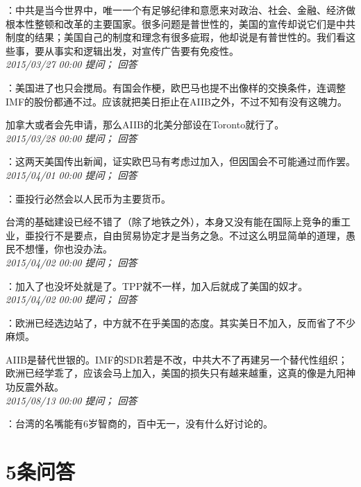 \documentclass[twocolumn]{ctexart}
\begin{document}
：中共是当今世界中，唯一一个有足够纪律和意愿来对政治、社会、金融、经济做根本性整顿和改革的主要国家。很多问题是普世性的，美国的宣传却说它们是中共制度的结果；美国自己的制度和理念有很多疵瑕，他却说是有普世性的。我们看这些事，要从事实和逻辑出发，对宣传广告要有免疫性。\\

\textit{\hfill\noindent\small 2015/03/27 00:00 提问； 回答}

：美国进了也只会搅局。有国会作梗，欧巴马也提不出像样的交换条件，连调整IMF的股份都通不过。应该就把美日拒止在AIIB之外，不过不知有没有这魄力。

加拿大或者会先申请，那么AIIB的北美分部设在Toronto就行了。\\

\textit{\hfill\noindent\small 2015/03/28 00:00 提问； 回答}

：这两天美国传出新闻，证实欧巴马有考虑过加入，但因国会不可能通过而作罢。\\

\textit{\hfill\noindent\small 2015/04/01 00:00 提问； 回答}

：亜投行必然会以人民币为主要货币。

台湾的基础建设已经不错了（除了地铁之外），本身又没有能在国际上竞争的重工业，亜投行不是要点，自由贸易协定才是当务之急。不过这么明显简单的道理，愚民不想懂，你也没办法。\\

\textit{\hfill\noindent\small 2015/04/02 00:00 提问； 回答}

：加入了也没坏处就是了。TPP就不一样，加入后就成了美国的奴才。\\

\textit{\hfill\noindent\small 2015/04/02 00:00 提问； 回答}

：欧洲已经选边站了，中方就不在乎美国的态度。其实美日不加入，反而省了不少麻烦。

AIIB是替代世银的。IMF的SDR若是不改，中共大不了再建另一个替代性组织；欧洲已经学乖了，应该会马上加入，美国的损失只有越来越重，这真的像是九阳神功反震外敌。\\

\textit{\hfill\noindent\small 2015/08/13 00:00 提问； 回答}

：台湾的名嘴能有6岁智商的，百中无一，没有什么好讨论的。\\

\section{5条问答}
\end{document}
